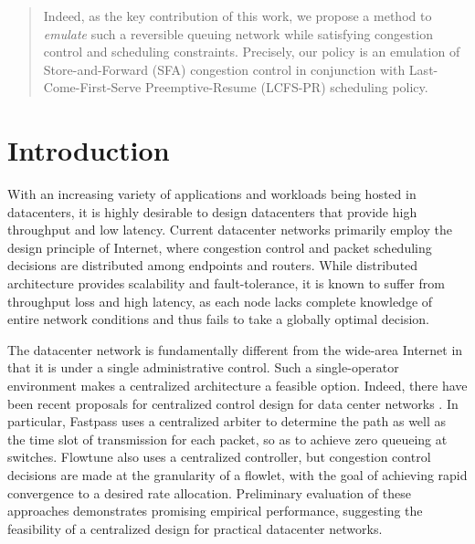 \documentclass[ssy,preprint]{imsart_axv}
\numberwithin{equation}{section}
\theoremstyle{plain}
\theoremstyle{definition}
\theoremstyle{remark}
\theoremstyle{plain}
\theoremstyle{plain}
\begin{document}
\begin{frontmatter}
\begin{abstract}
Indeed, as the key contribution of this work, we propose a method to
{\em emulate} such a reversible queuing network while satisfying congestion
control and scheduling constraints. Precisely, our policy is an emulation
of Store-and-Forward (SFA) congestion control in conjunction with  
Last-Come-First-Serve Preemptive-Resume (LCFS-PR) scheduling policy. 

\end{abstract}




\end{frontmatter}

\section{Introduction}

With an increasing variety of applications and workloads being hosted
in datacenters, it is highly desirable to design datacenters that
provide high throughput and low latency. Current datacenter networks
primarily employ the design principle of Internet, where congestion
control and packet scheduling decisions are distributed among endpoints
and routers. While distributed architecture provides scalability and
fault-tolerance, it is known to suffer from throughput loss and high
latency, as each node lacks complete knowledge of entire network conditions
and thus fails to take a globally optimal decision. 

The datacenter network is fundamentally different from the wide-area
Internet in that it is under a single administrative control. Such
a single-operator environment makes a centralized architecture a feasible option.
Indeed, there have been recent proposals for centralized control
design for data center networks \cite{perry17flowtune,perry2014fastpass}.
In particular, Fastpass \cite{perry2014fastpass} uses a centralized
arbiter to determine the path as well as the time slot of transmission
for each packet, so as to achieve zero queueing at switches. Flowtune
\cite{perry17flowtune} also uses a centralized controller, but congestion
control decisions are made at the granularity of a flowlet, with the
goal of achieving rapid convergence to a desired rate allocation.
Preliminary evaluation of these approaches demonstrates promising
empirical performance, suggesting the feasibility of a centralized design
for practical datacenter networks.
\end{document}

